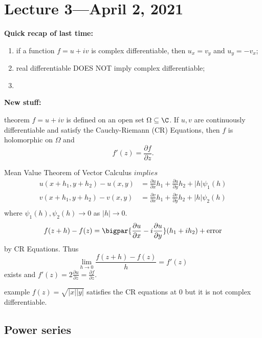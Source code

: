 \documentclass[class=article, crop=false]{standalone}
\begin{document}
\section{Lecture 3---April 2, 2021}

\textbf{Quick recap of last time:}

\begin{enumerate}[$\bullet$]
  \item if a function $f=u+iv$ is complex differentiable, then $u_x = v_y$ and $u_y=-v_x$;
  \item real differentiable DOES NOT imply complex differentiable;
  \item
\end{enumerate}

\textbf{New stuff:}

\begin{result}{theorem}
  $f=u+iv$ is defined on an open set $\Omega \subseteq \C$. If $u,v$ are continuously differentiable and satisfy the Cauchy-Riemann (CR) Equations, then $f$ is holomorphic on $\Omega$ and
    \[
      f'(z) = \frac{\partial f}{\partial z}.
    \]
\end{result}
\begin{pf}
  Mean Value Theorem of Vector Calculus $implies$
    \begin{align*}
      u(x+h_1,y+h_2)- u(x,y) &= \frac{\partial u}{\partial x}h_1 + \frac{\partial u}{\partial y}h_2 + |h| \psi_1(h) \\
      v(x+h_1,y+h_2)- v(x,y) &= \frac{\partial v}{\partial x}h_1 + \frac{\partial v}{\partial y}h_2 + |h| \psi_2(h) \\
    \end{align*}
  where $\psi_1(h),\psi_2(h) \to 0$ as $|h| \to 0$.
    \[
      f(z+h)-f(z) = \bigpar{\frac{\partial u}{\partial x}-i \frac{\partial u}{\partial y}}(h_1+ih_2) + \text{error}
    \]
  by CR Equations. Thus
    \[
      \lim_{h\to 0} \frac{f(z+h)-f(z)}{h} = f'(z)
    \]
  exists and $f'(z) = 2 \frac{\partial u}{\partial z} = \frac{\partial f}{\partial z}$.
\end{pf}

\begin{understandingcheck}{example}
  $f(z) = \sqrt{|x||y|}$ satisfies the CR equations at $0$ but it is not complex differentiable.
\end{understandingcheck}

\subsection*{Power series}
\end{document}
